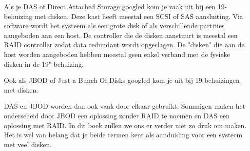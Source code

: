Als je DAS of Direct Attached Storage googled kom je vaak uit bij een 19\inch-behuizing met disken. Deze kast heeft meestal een SCSI of SAS aansluiting. Via software wordt het systeem als een grote disk of als verschillende partities aangeboden aan een host. De controller die de disken aanstuurt is meestal een RAID controller zodat data redundant wordt opgeslagen. De "disken" die aan de host worden aangeboden hebben meestal geen enkel verband met de fysieke disken in de 19"-behuizing.

Ook als JBOD of Just a Bunch Of Disks googled kom je uit bij 19\inch-behuizingen met disken.

DAS en JBOD worden dan ook vaak door elkaar gebruikt. Sommigen maken het onderscheid door JBOD een oplossing zonder RAID te noemen en DAS een oplossing met RAID. In dit boek zullen we ons er verder niet zo druk om maken. Het is wel van belang dat je beide termen kent als aanduiding voor een systeem met veel disken.
